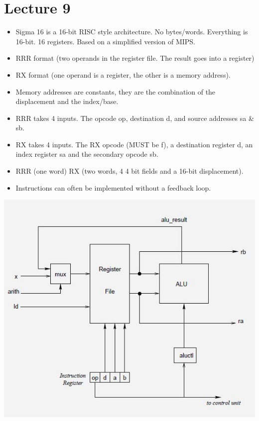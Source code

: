 \documentclass{article}
\begin{document}
\section*{Lecture 9}
\begin{itemize}
\item Sigma 16 is a 16-bit RISC style architecture. No bytes/words. Everything is 16-bit. 16 registers. Based on a simplified version of MIPS.
\item RRR format (two operands in the register file. The result goes into a register)
\item RX format (one operand is a register, the other is a memory address).
\item Memory addresses are constants, they are the combination of the displacement and the index/base.
\item RRR takes 4 inputs. The opcode op, destination d, and source addresses sa \& sb.
\item RX takes 4 inputs. The RX opcode (MUST be f), a destination register d, an index register sa and the secondary opcode sb.
\item RRR (one word) RX (two words, 4 4 bit fields and a 16-bit displacement).
\item Instructions can often be implemented without a feedback loop.
\end{itemize}
\begin{center}
\includegraphics[width=\linewidth]{rtm}
\end{center}
\end{document}
